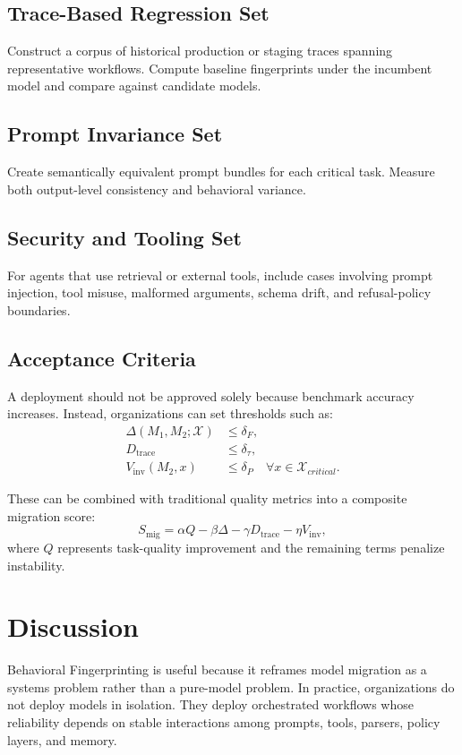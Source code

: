 \documentclass[11pt]{article}
\begin{document}
\subsection{Trace-Based Regression Set}
Construct a corpus of historical production or staging traces spanning representative workflows. Compute baseline fingerprints under the incumbent model and compare against candidate models.

\subsection{Prompt Invariance Set}
Create semantically equivalent prompt bundles for each critical task. Measure both output-level consistency and behavioral variance.

\subsection{Security and Tooling Set}
For agents that use retrieval or external tools, include cases involving prompt injection, tool misuse, malformed arguments, schema drift, and refusal-policy boundaries.

\subsection{Acceptance Criteria}
A deployment should not be approved solely because benchmark accuracy increases. Instead, organizations can set thresholds such as:
\begin{align}
\Delta(M_1, M_2; \mathcal{X}) &\leq \delta_F, \\
D_{\mathrm{trace}} &\leq \delta_\tau, \\
V_{\mathrm{inv}}(M_2, x) &\leq \delta_P \quad \forall x \in \mathcal{X}_{critical}.
\end{align}

These can be combined with traditional quality metrics into a composite migration score:
\begin{equation}
S_{\mathrm{mig}} = \alpha Q - \beta \Delta - \gamma D_{\mathrm{trace}} - \eta V_{\mathrm{inv}},
\end{equation}
where $Q$ represents task-quality improvement and the remaining terms penalize instability.

\section{Discussion}
Behavioral Fingerprinting is useful because it reframes model migration as a systems problem rather than a pure-model problem. In practice, organizations do not deploy models in isolation. They deploy orchestrated workflows whose reliability depends on stable interactions among prompts, tools, parsers, policy layers, and memory.
\end{document}
